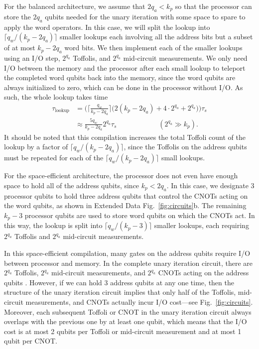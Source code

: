 \documentclass[reprint,twocolumn,secnumarabic,amssymb, aps, prx]{revtex4-2}
\newcommand{\kproc}{k_p}
\newcommand{\taus}{\tau_s}
\begin{document}
For the balanced architecture, we assume that $2q_a < \kproc$ so that the processor can store the $2q_a$ qubits needed for the unary iteration with some space to spare to apply the word operators. In this case, we will split the lookup into $\big\lceil q_w/(\kproc - 2q_a) \big\rceil$ smaller lookups each involving all the address bits but a subset of at most $\kproc - 2q_a$ word bits. We then implement each of the smaller lookups using an I/O step, $2^{q_a}$ Toffolis, and $2^{q_a}$ mid-circuit measurements. We only need I/O between the memory and the processor after each small lookup to teleport the completed word qubits back into the memory, since the word qubits are always initialized to zero, which can be done in the processor without I/O. As such, the whole lookup takes time
\begin{align}
    \tau_{\mathrm{lookup}} &= \Big(\Big\lceil\frac{q_w}{\kproc - 2q_a}\Big\rceil \big(2(\kproc - 2q_a) + 4\cdot 2^{q_a} + 2^{q_a}\big)\Big)\taus \nonumber\\
    &\approx \frac{5 q_w}{\kproc - 2q_a} 2^{q_a} \taus \qquad\qquad\qquad (2^{q_a} \gg \kproc).
\end{align}
It should be noted that this compilation increases the total Toffoli count of the lookup by a factor of \mbox{$\big\lceil q_w/(\kproc - 2q_a) \big\rceil$}, since the Toffolis on the address qubits must be repeated for each of the $\big\lceil q_w/(\kproc - 2q_a) \big\rceil$ small lookups.

For the space-efficient architecture, the processor does not even have enough space to hold all of the address qubits, since $\kproc < 2q_a$. In this case, we designate 3 processor qubits to hold three address qubits that control the CNOTs acting on the word qubits, as shown in Extended Data Fig.~\ref{fig:circuits}b. The remaining $\kproc - 3$ processor qubits are used to store word qubits on which the CNOTs act. In this way, the lookup is split into $\big\lceil q_w / (k_p - 3) \big\rceil$ smaller lookups, each requiring $2^{q_a}$ Toffolis and $2^{q_a}$ mid-circuit measurements.

In this space-efficient compilation, many gates on the address qubits require I/O between processor and memory. In the complete unary iteration circuit, there are $2^{q_a}$ Toffolis, $2^{q_a}$ mid-circuit measurements, and $2^{q_a}$ CNOTs acting on the address qubits \cite{babbush2018encoding}. However, if we can hold 3 address qubits at any one time, then the structure of the unary iteration circuit implies that only half of the Toffolis, mid-circuit measurements, and CNOTs actually incur I/O cost---see Fig.~\ref{fig:circuits}. Moreover, each subsequent Toffoli or CNOT in the unary iteration circuit always overlaps with the previous one by at least one qubit, which means that the I/O cost is at most 2 qubits per Toffoli or mid-circuit measurement and at most 1 qubit per CNOT.
\end{document}
